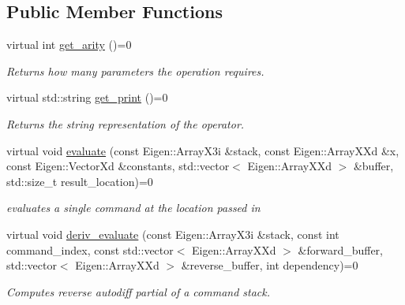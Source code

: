 \subsection*{Public Member Functions}
\begin{DoxyCompactItemize}
\item 
virtual int \hyperlink{classOperation_ae6af21e893ca28e13471e2f7879afd3e}{get\+\_\+arity} ()=0\hypertarget{classOperation_ae6af21e893ca28e13471e2f7879afd3e}{}\label{classOperation_ae6af21e893ca28e13471e2f7879afd3e}

\begin{DoxyCompactList}\small\item\em Returns how many parameters the operation requires. \end{DoxyCompactList}\item 
virtual std\+::string \hyperlink{classOperation_aa905714b34d5cc518fa9b248682f4ee7}{get\+\_\+print} ()=0\hypertarget{classOperation_aa905714b34d5cc518fa9b248682f4ee7}{}\label{classOperation_aa905714b34d5cc518fa9b248682f4ee7}

\begin{DoxyCompactList}\small\item\em Returns the string representation of the operator. \end{DoxyCompactList}\item 
virtual void \hyperlink{classOperation_a89093eb53f975dd98b6a36d85fa17276}{evaluate} (const Eigen\+::\+Array\+X3i \&stack, const Eigen\+::\+Array\+X\+Xd \&x, const Eigen\+::\+Vector\+Xd \&constants, std\+::vector$<$ Eigen\+::\+Array\+X\+Xd $>$ \&buffer, std\+::size\+\_\+t result\+\_\+location)=0
\begin{DoxyCompactList}\small\item\em evaluates a single command at the location passed in \end{DoxyCompactList}\item 
virtual void \hyperlink{classOperation_a42b611d08c6b00568c5d1b08688ebcce}{deriv\+\_\+evaluate} (const Eigen\+::\+Array\+X3i \&stack, const int command\+\_\+index, const std\+::vector$<$ Eigen\+::\+Array\+X\+Xd $>$ \&forward\+\_\+buffer, std\+::vector$<$ Eigen\+::\+Array\+X\+Xd $>$ \&reverse\+\_\+buffer, int dependency)=0
\begin{DoxyCompactList}\small\item\em Computes reverse autodiff partial of a command stack. \end{DoxyCompactList}\end{DoxyCompactItemize}


